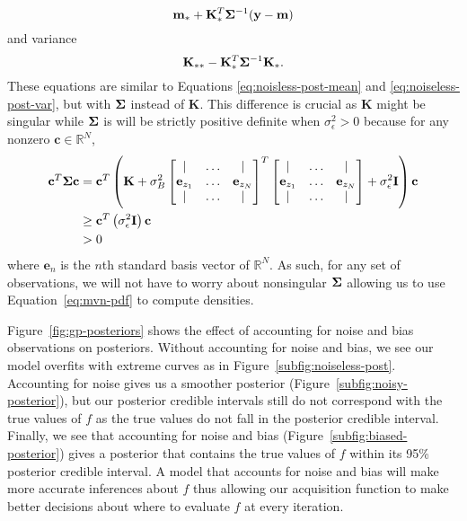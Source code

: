 \begin{equation*}
    \mathbf{m}_* + \mathbf{K}_*^T \boldsymbol{\Sigma}^{-1} (\mathbf{y} - \mathbf{m})
\end{equation*}
and variance
\begin{equation*}
    \mathbf{K}_{* *} - \mathbf{K}_*^T \boldsymbol{\Sigma}^{-1} \mathbf{K}_*.
\end{equation*}
These equations are similar to Equations \ref{eq:noisless-post-mean} and \ref{eq:noiseless-post-var}, but with $\boldsymbol{\Sigma}$ instead of $\mathbf{K}$.
This difference is crucial as $\mathbf{K}$ might be singular
while $\boldsymbol{\Sigma}$ is will be strictly positive definite when $\sigma_{\epsilon}^2 > 0$ because
for any nonzero $\mathbf{c} \in \mathbb{R}^{N}$,
\begin{align*}
    \mathbf{c}^{T} \boldsymbol{\Sigma} \mathbf{c}
    &= \mathbf{c}^{T} \left(\mathbf{K} +
    \sigma^2_B
    \begin{bmatrix}
        \vert & \dots & \vert \\
        \mathbf{e}_{z_1} & \dots & \mathbf{e}_{z_N} \\
        \vert & \dots & \vert \\
    \end{bmatrix}
    ^{T}
    \begin{bmatrix}
        \vert & \dots & \vert \\
        \mathbf{e}_{z_1} & \dots & \mathbf{e}_{z_N} \\
        \vert & \dots & \vert \\
    \end{bmatrix}
    + \sigma^2_{\epsilon} \mathbf{I}
    \right) \mathbf{c} \\
    &\geq \mathbf{c}^{T} \left(\sigma_{\epsilon}^{2} \mathbf{I} \right) \mathbf{c} \\
    & > 0
\end{align*}
where $\mathbf{e}_n$ is the $n$th standard basis vector of $\mathbb{R}^{N}$.
As such, for any set of observations, we will not have to worry about nonsingular $\boldsymbol{\Sigma}$ allowing us to use Equation~\ref{eq:mvn-pdf} to compute densities.

Figure~\ref{fig:gp-posteriors} shows the effect of accounting for noise and bias observations on posteriors.
Without accounting for noise and bias, we see our model overfits with extreme curves as in Figure~\ref{subfig:noiseless-post}.
Accounting for noise gives us a smoother posterior (Figure~\ref{subfig:noisy-posterior}), but our posterior credible intervals still do not correspond with the true values of $f$ as the true values do not fall in the posterior credible interval.
Finally, we see that accounting for noise and bias (Figure~\ref{subfig:biased-posterior}) gives a posterior that contains the true values of $f$ within its 95\% posterior credible interval.
A model that accounts for noise and bias will make more accurate inferences about $f$ thus allowing our acquisition function to make better decisions about where to evaluate $f$ at every iteration.

